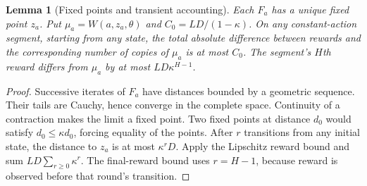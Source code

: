 \documentclass[11pt,a4paper]{article}
\newtheorem{lemma}[theorem]{Lemma}
\theoremstyle{remark}\newtheorem{remark}[theorem]{Remark}
\begin{document}
\begin{lemma}[Fixed points and transient accounting]\label{lem:transient}
Each $F_a$ has a unique fixed point $z_a$. Put $\mu_a=W(a,z_a,\theta)$ and $C_0=LD/(1-\kappa)$. On any constant-action segment, starting from any state, the total absolute difference between rewards and the corresponding number of copies of $\mu_a$ is at most $C_0$. The segment's $H$th reward differs from $\mu_a$ by at most $LD\kappa^{H-1}$.
\end{lemma}
\begin{proof}
Successive iterates of $F_a$ have distances bounded by a geometric sequence. Their tails are Cauchy, hence converge in the complete space. Continuity of a contraction makes the limit a fixed point. Two fixed points at distance $d_0$ would satisfy $d_0\le\kappa d_0$, forcing equality of the points. After $r$ transitions from any initial state, the distance to $z_a$ is at most $\kappa^rD$. Apply the Lipschitz reward bound and sum $LD\sum_{r\ge0}\kappa^r$. The final-reward bound uses $r=H-1$, because reward is observed before that round's transition.
\end{proof}
\end{document}
